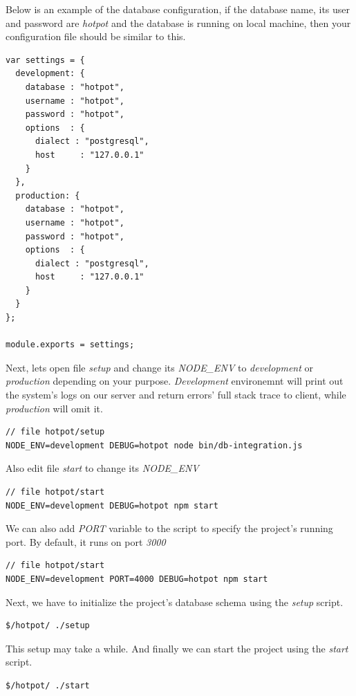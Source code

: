 Below is an example of the database configuration, if the database name, its user and password are \emph{hotpot} and the database is running on local machine, then your configuration file should be similar to this.
\begin{lstlisting}[breaklines=false,frame=lt]
var settings = {                                                                                                                                                     
  development: { 
    database : "hotpot",
    username : "hotpot",
    password : "hotpot",
    options  : { 
      dialect : "postgresql",
      host     : "127.0.0.1"   
    }
  },
  production: { 
    database : "hotpot",
    username : "hotpot",
    password : "hotpot",
    options  : { 
      dialect : "postgresql",  
      host     : "127.0.0.1"   
    }
  }
};
  
module.exports = settings;
\end{lstlisting}

Next, lets open file \emph{setup} and change its \emph{NODE\_ENV} to \emph{development} or \emph{production} depending on your purpose.
\emph{Development} environemnt will print out the system's logs on our server and return errors' full stack trace to client, while  \emph{production} will omit it.
\begin{lstlisting}[breaklines=false,frame=lt]
// file hotpot/setup
NODE_ENV=development DEBUG=hotpot node bin/db-integration.js
\end{lstlisting}

Also edit file \emph{start} to change its \emph{NODE\_ENV}
\begin{lstlisting}[breaklines=false,frame=lt]
// file hotpot/start
NODE_ENV=development DEBUG=hotpot npm start
\end{lstlisting}
We can also add \emph{PORT} variable to the script to specify the project's running port. By default, it runs on port \emph{3000}
\begin{lstlisting}[breaklines=false,frame=lt]
// file hotpot/start
NODE_ENV=development PORT=4000 DEBUG=hotpot npm start
\end{lstlisting}

Next, we have to initialize the project's database schema using the \emph{setup} script.
\begin{lstlisting}[breaklines=false,frame=lt]
$/hotpot/ ./setup
\end{lstlisting}
This setup may take a while. And finally we can start the project using the \emph{start} script.
\begin{lstlisting}[breaklines=false,frame=lt]
$/hotpot/ ./start
\end{lstlisting}

